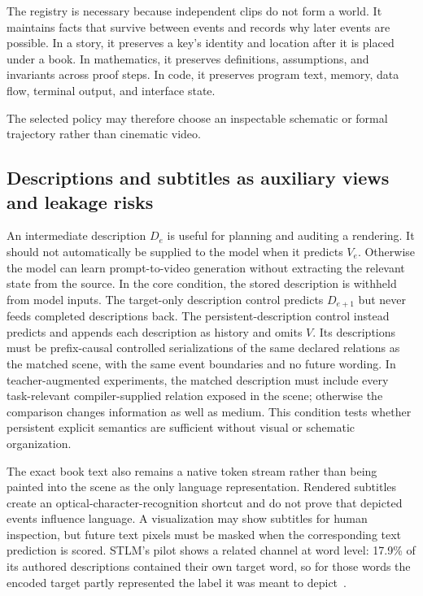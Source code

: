 \documentclass[11pt]{article}
\begin{document}
The registry is necessary because independent clips do not form a world. It maintains facts that survive between events and records why later events are possible. In a story, it preserves a key's identity and location after it is placed under a book. In mathematics, it preserves definitions, assumptions, and invariants across proof steps. In code, it preserves program text, memory, data flow, terminal output, and interface state.

The selected policy may therefore choose an inspectable schematic or formal trajectory rather than cinematic video.

\subsection{Descriptions and subtitles as auxiliary views and leakage risks}

An intermediate description $D_e$ is useful for planning and auditing a rendering. It should not automatically be supplied to the model when it predicts $V_e$. Otherwise the model can learn prompt-to-video generation without extracting the relevant state from the source. In the core condition, the stored description is withheld from model inputs. The target-only description control predicts $D_{e+1}$ but never feeds completed descriptions back. The persistent-description control instead predicts and appends each description as history and omits $V$. Its descriptions must be prefix-causal controlled serializations of the same declared relations as the matched scene, with the same event boundaries and no future wording. In teacher-augmented experiments, the matched description must include every task-relevant compiler-supplied relation exposed in the scene; otherwise the comparison changes information as well as medium. This condition tests whether persistent explicit semantics are sufficient without visual or schematic organization.

The exact book text also remains a native token stream rather than being painted into the scene as the only language representation. Rendered subtitles create an optical-character-recognition shortcut and do not prove that depicted events influence language. A visualization may show subtitles for human inspection, but future text pixels must be masked when the corresponding text prediction is scored. STLM's pilot shows a related channel at word level: 17.9\% of its authored descriptions contained their own target word, so for those words the encoded target partly represented the label it was meant to depict~\cite{westerberg2026stlm}.
\end{document}
